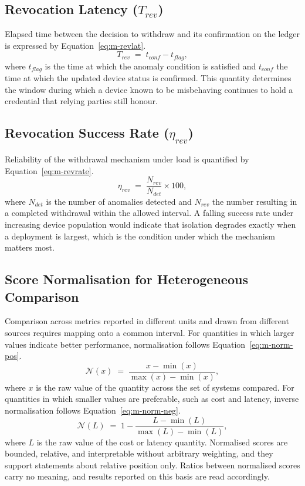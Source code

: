\subsection{Revocation Latency ($T_{rev}$)}
\label{sec:metric-revocation-latency}

Elapsed time between the decision to withdraw and its confirmation on the ledger is expressed by Equation~\eqref{eq:m-revlat}.
\begin{equation}
\label{eq:m-revlat}
T_{rev} \;=\; t_{conf} - t_{flag} ,
\end{equation}
where $t_{flag}$ is the time at which the anomaly condition is satisfied and $t_{conf}$ the time at which the updated device status is confirmed. This quantity determines the window during which a device known to be misbehaving continues to hold a credential that relying parties still honour.

\subsection{Revocation Success Rate ($\eta_{rev}$)}
\label{sec:metric-revocation-rate}

Reliability of the withdrawal mechanism under load is quantified by Equation~\eqref{eq:m-revrate}.
\begin{equation}
\label{eq:m-revrate}
\eta_{rev} \;=\; \frac{N_{rev}}{N_{det}} \times 100 ,
\end{equation}
where $N_{det}$ is the number of anomalies detected and $N_{rev}$ the number resulting in a completed withdrawal within the allowed interval. A falling success rate under increasing device population would indicate that isolation degrades exactly when a deployment is largest, which is the condition under which the mechanism matters most.

\subsection{Score Normalisation for Heterogeneous Comparison}
\label{sec:metric-normalisation}

Comparison across metrics reported in different units and drawn from different sources requires mapping onto a common interval. For quantities in which larger values indicate better performance, normalisation follows Equation~\eqref{eq:m-norm-pos}.
\begin{equation}
\label{eq:m-norm-pos}
\mathcal{N}(x) \;=\; \frac{x - \min(x)}{\max(x) - \min(x)} ,
\end{equation}
where $x$ is the raw value of the quantity across the set of systems compared. For quantities in which smaller values are preferable, such as cost and latency, inverse normalisation follows Equation~\eqref{eq:m-norm-neg}.
\begin{equation}
\label{eq:m-norm-neg}
\mathcal{N}(L) \;=\; 1 - \frac{L - \min(L)}{\max(L) - \min(L)} ,
\end{equation}
where $L$ is the raw value of the cost or latency quantity. Normalised scores are bounded, relative, and interpretable without arbitrary weighting, and they support statements about relative position only. Ratios between normalised scores carry no meaning, and results reported on this basis are read accordingly.


